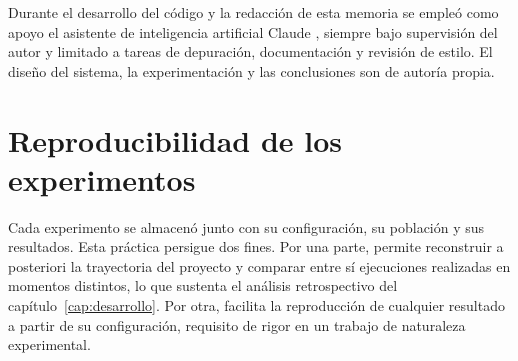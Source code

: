 Durante el desarrollo del código y la redacción de esta memoria se empleó como apoyo el asistente de inteligencia artificial Claude \cite{anthropic}, siempre bajo supervisión del autor y limitado a tareas de depuración, documentación y revisión de estilo. El diseño del sistema, la experimentación y las conclusiones son de autoría propia.

\section{Reproducibilidad de los experimentos}

Cada experimento se almacenó junto con su configuración, su población y sus resultados. Esta práctica persigue dos fines. Por una parte, permite reconstruir a posteriori la trayectoria del proyecto y comparar entre sí ejecuciones realizadas en momentos distintos, lo que sustenta el análisis retrospectivo del capítulo~\ref{cap:desarrollo}. Por otra, facilita la reproducción de cualquier resultado a partir de su configuración, requisito de rigor en un trabajo de naturaleza experimental.
